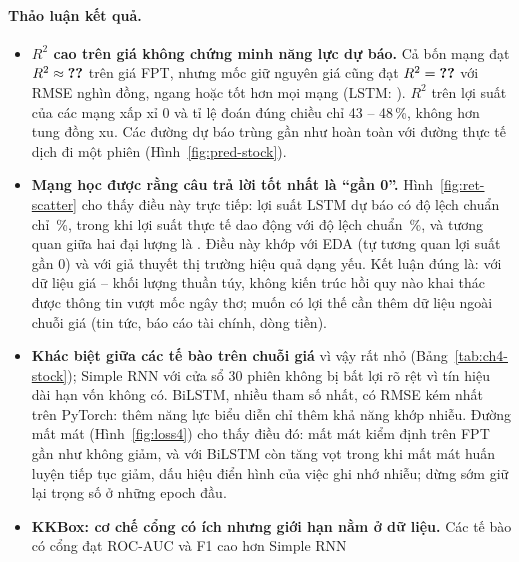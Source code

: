 
\paragraph{Thảo luận kết quả.}
\begin{itemize}
  \item \textbf{$R^2$ cao trên giá không chứng minh năng lực dự báo.} Cả bốn mạng đạt $R^2 \approx \SL{ch4_torch/stock/lstm/r2}$
    trên giá FPT, nhưng mốc giữ nguyên giá cũng đạt $R^2 = \SL{ch4_torch/stock/naive/r2}$ với RMSE
     nghìn đồng, ngang hoặc tốt hơn mọi mạng (LSTM: ). $R^2$
    trên lợi suất của các mạng xấp xỉ 0 và tỉ lệ đoán đúng chiều chỉ 43 -- 48\,\%, không hơn tung đồng xu. Các đường dự báo
    trùng gần như hoàn toàn với đường thực tế dịch đi một phiên (Hình~\ref{fig:pred-stock}).
  \item \textbf{Mạng học được rằng câu trả lời tốt nhất là “gần 0”.} Hình~\ref{fig:ret-scatter} cho thấy điều này trực tiếp:
    lợi suất LSTM dự báo có độ lệch chuẩn chỉ \,\%, trong khi lợi suất thực tế dao động với độ lệch
    chuẩn \,\%, và tương quan giữa hai đại lượng là . Điều này khớp với
    EDA (tự tương quan lợi suất gần 0) và với giả thuyết thị trường hiệu quả dạng yếu. Kết luận đúng là: với dữ liệu giá --
    khối lượng thuần túy, không kiến trúc hồi quy nào khai thác được thông tin vượt mốc ngây thơ; muốn có lợi thế cần thêm dữ
    liệu ngoài chuỗi giá (tin tức, báo cáo tài chính, dòng tiền).
  \item \textbf{Khác biệt giữa các tế bào trên chuỗi giá} vì vậy rất nhỏ (Bảng~\ref{tab:ch4-stock}); Simple RNN với cửa sổ 30
    phiên không bị bất lợi rõ rệt vì tín hiệu dài hạn vốn không có. BiLSTM, nhiều tham số nhất, có RMSE kém nhất trên PyTorch:
    thêm năng lực biểu diễn chỉ thêm khả năng khớp nhiễu. Đường mất mát (Hình~\ref{fig:loss4}) cho thấy điều đó: mất mát kiểm
    định trên FPT gần như không giảm, và với BiLSTM còn tăng vọt trong khi mất mát huấn luyện tiếp tục giảm, dấu hiệu điển hình
    của việc ghi nhớ nhiễu; dừng sớm giữ lại trọng số ở những epoch đầu.
  \item \textbf{KKBox: cơ chế cổng có ích nhưng giới hạn nằm ở dữ liệu.} Các tế bào có cổng đạt ROC-AUC và F1 cao hơn Simple RNN

\end{itemize}
